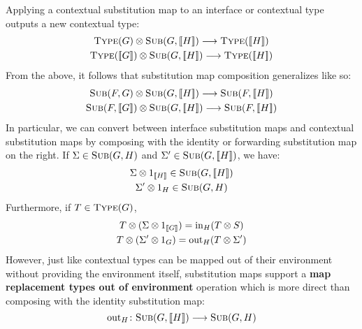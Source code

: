 \documentclass[../generics]{subfiles}
\begin{document}
Applying a contextual substitution map to an interface or contextual type outputs a new contextual type:
\begin{gather*}
\TypeObj{G}\otimes\SubMapObj{G}{\EquivClass{H}}\longrightarrow\TypeObj{\EquivClass{H}}\\
\TypeObj{\EquivClass{G}}\otimes\SubMapObj{G}{\EquivClass{H}}\longrightarrow\TypeObj{\EquivClass{H}}
\end{gather*}
From the above, it follows that substitution map composition generalizes like so:
\begin{gather*}
\SubMapObj{F}{G}\otimes\SubMapObj{G}{\EquivClass{H}}\longrightarrow\SubMapObj{F}{\EquivClass{H}}\\
\SubMapObj{F}{\EquivClass{G}}\otimes\SubMapObj{G}{\EquivClass{H}}\longrightarrow\SubMapObj{F}{\EquivClass{H}}
\end{gather*}
In particular, we can convert between interface substitution maps and contextual substitution maps by composing with the identity or forwarding substitution map on the right. If $\Sigma\in\textsc{Sub}({G, H})$ and $\Sigma^\prime\in\textsc{Sub}({G, [\![H]\!]})$, we have:
\begin{gather*}
\Sigma\otimes 1_{[\![H]\!]}\in\textsc{Sub}({G, [\![H]\!]})\\
\Sigma^\prime\otimes 1_H\in\textsc{Sub}({G, H})
\end{gather*}
Furthermore, if $T\in\textsc{Type}({G})$,
\begin{gather*}
T\otimes (\Sigma\otimes 1_{[\![G]\!]}) = \mathrm{in}_H(T\otimes S)\\
T\otimes (\Sigma^\prime \otimes 1_G) = \mathrm{out}_H(T\otimes \Sigma^\prime)
\end{gather*}
However, just like contextual types can be mapped out of their environment without providing the environment itself, substitution maps support a \textbf{map replacement types out of environment} operation which is more direct than composing with the identity substitution map:
\[\mathrm{out}_H\colon\textsc{Sub}({G, [\![H]\!]})\longrightarrow\textsc{Sub}({G, H})\]
\end{document}
